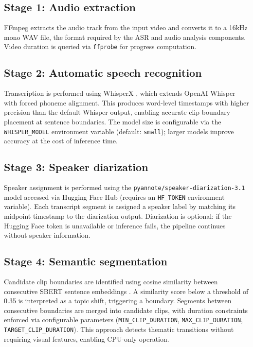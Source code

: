 \documentclass[ENG]{TFUOC}
\begin{document}
\subsection*{Stage 1: Audio extraction}

FFmpeg extracts the audio track from the input video and converts it to a 16kHz mono WAV file, the format required by the ASR and audio analysis components. Video duration is queried via \texttt{ffprobe} for progress computation.

\subsection*{Stage 2: Automatic speech recognition}

Transcription is performed using WhisperX \cite{bain2023whisperx}, which extends OpenAI Whisper \cite{radford2023whisper} with forced phoneme alignment. This produces word-level timestamps with higher precision than the default Whisper output, enabling accurate clip boundary placement at sentence boundaries. The model size is configurable via the \texttt{WHISPER\_MODEL} environment variable (default: \texttt{small}); larger models improve accuracy at the cost of inference time.

\subsection*{Stage 3: Speaker diarization}

Speaker assignment is performed using the \texttt{pyannote/speaker-diarization-3.1} model \cite{bredin2021pyannote} accessed via Hugging Face Hub (requires an \texttt{HF\_TOKEN} environment variable). Each transcript segment is assigned a speaker label by matching its midpoint timestamp to the diarization output. Diarization is optional: if the Hugging Face token is unavailable or inference fails, the pipeline continues without speaker information.

\subsection*{Stage 4: Semantic segmentation}

Candidate clip boundaries are identified using cosine similarity between consecutive SBERT sentence embeddings \cite{reimers2019sbert}. A similarity score below a threshold of 0.35 is interpreted as a topic shift, triggering a boundary. Segments between consecutive boundaries are merged into candidate clips, with duration constraints enforced via configurable parameters (\texttt{MIN\_CLIP\_DURATION}, \texttt{MAX\_CLIP\_DURATION}, \texttt{TARGET\_CLIP\_DURATION}). This approach detects thematic transitions without requiring visual features, enabling CPU-only operation.
\end{document}

